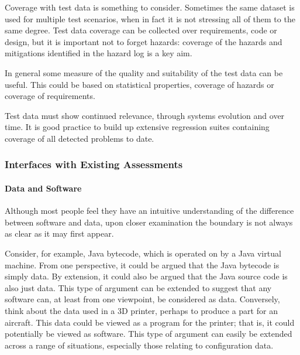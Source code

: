 Coverage with test data is something to consider. Sometimes the same \gls{dataset} is used for multiple test scenarios, when in fact it is not stressing all of them to the same degree. Test data coverage can be collected over requirements, code or design, but it is important not to forget hazards: coverage of the hazards and mitigations identified in the \gls{hazard log} is a key aim. 

In general some measure of the quality and suitability of the test data can be useful. This could be based on statistical properties, coverage of hazards or coverage of requirements. 

Test data must show continued relevance, through systems evolution and over time. It is good practice to build up extensive regression suites containing coverage of all detected problems to date.

\subsubsection{Interfaces with Existing Assessments}
\paragraph{Data and Software}
Although most people feel they have an intuitive understanding of the difference between software and data, upon closer examination the boundary is not always as clear as it may first appear.

Consider, for example, Java bytecode, which is operated on by a Java virtual machine. From one perspective, it could be argued that the Java bytecode is simply data. By extension, it could also be argued that the Java source code is also just data. This type of argument can be extended to suggest that any software can, at least from one viewpoint, be considered as data. Conversely, think about the data used in a 3D printer, perhaps to produce a part for an aircraft. This data could be viewed as a program for the printer; that is, it could potentially be viewed as software. This type of argument can easily be extended across a range of situations, especially those relating to \gls{configuration data}.

